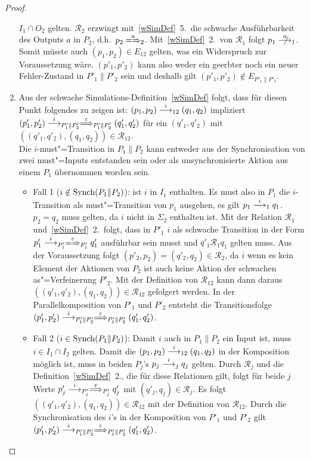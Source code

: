 \begin{proof}
\begin{enumerate}
      $I_1\cap O_2$ gelten. $\mathcal{R}_2$ erzwingt mit~\ref{wSimDef}~5.\ die
      schwache Ausführbarkeit des Outputs $a$ in $P_2$, d.h.\ $p_2
      \weakmay[a]_2$. Mit~\ref{wSimDef}~2.\ von $\mathcal{R}_1$ folgt $p_1
      \nmust[a]_1$. Somit müsste auch $(p_1,p_2)\in E_{12}$ gelten, was ein
      Widerspruch zur Voraussetzung wäre. $(p'_1,p'_2)$ kann also weder ein
      geerbter noch ein neuer Fehler-Zustand in $P'_1\|P'_2$ sein und deshalb
      gilt $(p'_1,p'_2)\notin E_{P'_1\|P'_2}$.
    \item Aus der schwache Simulations-Definition~\ref{wSimDef} folgt, dass für
      diesen Punkt folgendes zu zeigen ist: $(p_1,p_2)\must[i]_{12}(q_1,q_2)$
      impliziert $(p'_1,p'_2) \must[i]_{P'_1\|P'_2}
      \weakmust[\varepsilon]_{P'_1\|P'_2} (q'_1,q'_2)$ für ein $(q'_1,q'_2)$
      mit $((q'_1,q'_2),(q_1,q_2))\in\mathcal{R}_{12}$.\\
      Die $i$-must"=Transition in $P_1\|P_2$ kann entweder aus der
      Synchronisation von zwei must"=Inputs entstanden sein oder als
      unsynchronisierte Aktion aus einem $P_1$ übernommen worden sein.
      \begin{itemize}
        \item Fall 1 ($i\notin\mathrm{Synch} (P_1\|P_2)$): \OBdA{} ist $i$ in $I_1$
          enthalten. Es must also in $P_1$ die $i$-Transition als
          must"=Transition von $p_1$ ausgehen, es gilt $p_1\must[i]_1 q_1$.
          $p_2=q_2$ muss gelten, da $i$ nicht in $\Sigma _2$ enthalten ist. Mit
          der Relation $\mathcal{R}_1$ und~\ref{wSimDef}~2.\ folgt, dass in
          $P'_1$ $i$ als schwache Transition in der Form $p'_1\must[i]_{P'_1}
          \weakmay[\varepsilon]_{P'_1}q'_1$ ausführbar sein musst und $q'_1
          \mathcal{R}_1q_1$ gelten muss. Aus der Voraussetzung folgt
          $(p'_2,p_2)=(q'_2,q_2)\in\mathcal{R}_2$, da $i$ wenn es kein Element
          der Aktionen von $P_2$ ist auch keine Aktion der schwachen
          as"=Verfeinerung $P'_2$. Mit der Definition von $\mathcal{R}_{12}$
          kann dann daraus $((q'_1,q'_2),(q_1,q_2)) \in \mathcal{R}_{12}$
          gefolgert werden. In der Parallelkomposition von $P'_1$ und $P'_2$
          entsteht die Transitionsfolge $(p'_1,p'_2)\must[i]_{P'_1\|P'_2}
          \weakmust[\varepsilon]_{P'_1\|P'_2} (q'_1,q'_2)$.
        \item Fall 2 ($i\in\mathrm{Synch} (P_1\|P_2)$): Damit $i$ auch in $P_1\|P_2$
          ein Input ist, muss $i\in I_1\cap I_2$ gelten. Damit die
          $(p_1,p_2)\must[i]_{12}(q_1,q_2)$ in der Komposition möglich ist,
          muss in beiden $P_j$'s $p_j\must[i]_j q_j$ gelten. Durch
          $\mathcal{R}_j$ und die Definition~\ref{wSimDef}~2., die für diese
          Relationen gilt, folgt für beide $j$ Werte $p'_j\must[i]_{P'_j}
          \weakmust[\varepsilon]_{P'_j}q'_j$ mit $(q'_j,q_j)\in\mathcal{R}_j$.
          Es folgt $((q'_1,q'_2),(q_1,q_2)) \in \mathcal{R}_{12}$ mit der
          Definition von $\mathcal{R}_{12}$. Durch die Synchronisation des
          $i$'s in der Komposition von $P'_1$ und $P'_2$ gilt $(p'_1,p'_2)
          \must[i]_{P'_1\|P'_2} \weakmust[\varepsilon]_{P'_1\|P'_2}
          (q'_1,q'_2)$.
      \end{itemize}


\end{enumerate}
\end{proof}
